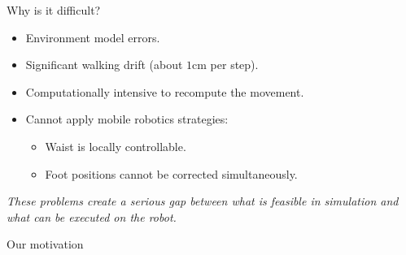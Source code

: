 \documentclass[hyperref={pdfpagelabels=false}]{beamer}
\begin{document}
\begin{frame}{Why is it difficult?}
  \begin{itemize}
    \item Environment model errors.
    \item Significant walking drift (about $1\text{cm}$ per step).
    \item Computationally intensive to recompute the movement.

    \item Cannot apply mobile robotics strategies:
      \begin{itemize}
        \item Waist is locally controllable.
        \item Foot positions cannot be corrected simultaneously.
      \end{itemize}
  \end{itemize}

  \emph{These problems create a serious gap between what is feasible
    in simulation and what can be executed on the robot.}\\
  {
    \footnotesize
    \cite{11humanoids.baudouin}
  }
\end{frame}

\begin{frame}{Our motivation}
\end{frame}
\end{document}
